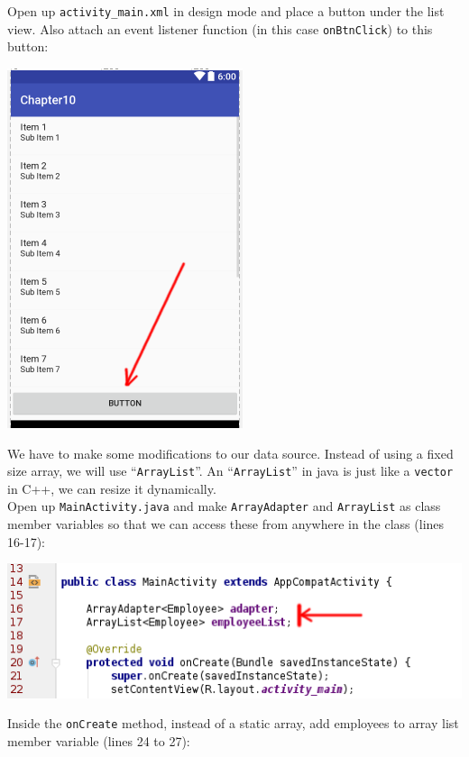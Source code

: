 Open up \texttt{activity\_main.xml} in design mode and place a button under the list view. Also attach an event listener function (in this case \texttt{onBtnClick}) to this button:

\begin{center}
	\includegraphics[scale=0.4]{chapters/ch10/images/30}
\end{center}

We have to make some modifications to our data source. Instead of using a fixed size
array, we will use ``\texttt{ArrayList}''. An ``\texttt{ArrayList}'' in java is just like a \texttt{vector} in C++, we can resize it dynamically. \\

Open up \texttt{MainActivity.java} and make \texttt{ArrayAdapter} and \texttt{ArrayList} as class member variables so that we can access these from anywhere in the class (lines 16-17):

\begin{center}
	\includegraphics[scale=0.4]{chapters/ch10/images/31}
\end{center}

Inside the \texttt{onCreate} method, instead of a static array, add employees to array list member variable (lines 24 to 27):

